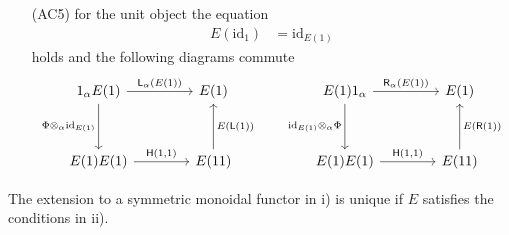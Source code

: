 \begin{thm}
\begin{enumerate}
\begin{enumerate}
\item[(AC5)]
for the unit object the equation
\begin{align*}
  E(\mathrm{id}_{1})
  &=
  \mathrm{id}_{E(1)}
\end{align*}
holds and the following diagrams commute
\begin{equation*}
\begin{tikzcd}[row sep=3.3em,column sep=4em]
  1_{\alpha} E(1)
  \ar{r}{\mathsf{L}_{\alpha}(E(1))}
  \ar{d}[swap]{\Phi \otimes_{\alpha} \mathrm{id}_{E(1)}}
  &
  E(1)
  \\
  E(1) E(1)
  \ar{r}{\mathsf{H}(1,1)}
  &
  E(1 1)
  \ar{u}[swap]{E(\mathsf{L}(1))}
\end{tikzcd}
\qquad
\begin{tikzcd}[row sep=3.3em,column sep=4em]
  E(1) 1_{\alpha}
  \ar{r}{\mathsf{R}_{\alpha}(E(1))}
  \ar{d}[swap]{\mathrm{id}_{E(1)} \otimes_{\alpha} \Phi}
  &
  E(1)
  \\
  E(1) E(1)
  \ar{r}{\mathsf{H}(1,1)}
  &
  E(1 1)
  \ar{u}[swap]{E(\mathsf{R}(1))}
\end{tikzcd}
\end{equation*}
\end{enumerate}
\end{enumerate}
The extension to a symmetric monoidal functor in i) is unique if $E$ satisfies the conditions in ii).
\end{thm}
